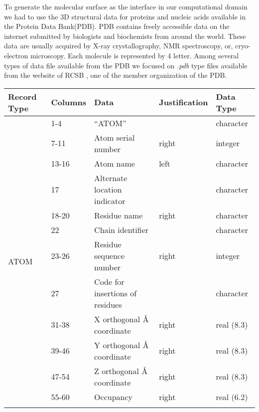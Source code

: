 To generate the molecular surface as the interface in our computational domain we had to use the 3D structural data for proteins and nucleic acids available in the Protein Data Bank(PDB). PDB contains freely accessible data on the internet submitted by biologists and biochemists from around the world. These data are usually acquired by  X-ray crystallography, NMR spectroscopy, or, cryo-electron microscopy. Each molecule is represented by 4 letter. Among several types of data file available from the PDB we focused on \textit{.pdb} type files available from the website of RCSB \cite{RCSB}, one of the member organization of the PDB.
\begin{table}[!ht]
\begin{tabular}{|l|l|l|l|l|}
\hline
Record Type             & Columns & Data                            & Justification & Data Type  \\ \hline
\multirow{15}{*}{ATOM}  & 1-4   & “ATOM”                          &               & character  \\ \cline{2-5} 
                        & 7-11  & Atom serial number              & right         & integer    \\ \cline{2-5} 
                        & 13-16   & Atom name                       & left         & character  \\ \cline{2-5} 
                        & 17      & Alternate location indicator    &               & character  \\ \cline{2-5} 
                        & 18-20  & Residue name                    & right         & character  \\ \cline{2-5} 
                        & 22      & Chain identifier                &               & character  \\ \cline{2-5} 
                        & 23-26   & Residue sequence number         & right         & integer    \\ \cline{2-5} 
                        & 27      & Code for insertions of residues &               & character  \\ \cline{2-5} 
                        & 31-38   & X orthogonal Å coordinate       & right         & real (8.3) \\ \cline{2-5} 
                        & 39-46   & Y orthogonal Å coordinate       & right         & real (8.3) \\ \cline{2-5} 
                        & 47-54   & Z orthogonal Å coordinate       & right         & real (8.3) \\ \cline{2-5} 
                        & 55-60   & Occupancy                       & right         & real (6.2) \\ \cline{2-5} 

\end{tabular}
\end{table}

